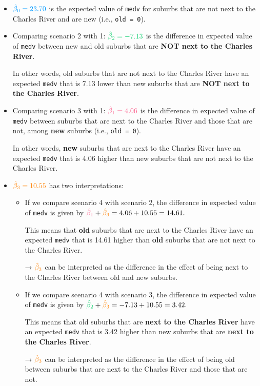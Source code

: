 \documentclass[
  12pt,
  letterpaper,
]{scrbook}
\theoremstyle{plain}
\theoremstyle{definition}
\theoremstyle{remark}
\begin{document}
\begin{itemize}
\item
  \(\color[HTML]{0099FF}{\hat{\beta}_0} = 23.70\) is the expected value
  of \texttt{medv} for suburbs that are not next to the Charles River
  and are new (i.e., \texttt{old\ =\ 0}).
\item
  Comparing scenario 2 with 1:
  \(\color[HTML]{00CC66}{\hat{\beta}_2} = -7.13\) is the difference in
  expected value of \texttt{medv} between new and old suburbs that are
  \textbf{NOT next to the Charles River}.

  In other words, old suburbs that are not next to the Charles River
  have an expected \texttt{medv} that is 7.13 lower than new suburbs
  that are \textbf{NOT next to the Charles River}.
\item
  Comparing scenario 3 with 1:
  \(\color[HTML]{fb5b89}{\hat{\beta}_1} = 4.06\) is the difference in
  expected value of \texttt{medv} between suburbs that are next to the
  Charles River and those that are not, among \textbf{new} suburbs
  (i.e., \texttt{old\ =\ 0}).

  In other words, \textbf{new} suburbs that are next to the Charles
  River have an expected \texttt{medv} that is 4.06 higher than new
  suburbs that are not next to the Charles River.
\item
  \(\color{orange}{\hat{\beta}_3} = 10.55\) has two interpretations:

  \begin{itemize}
  \item
    If we compare scenario 4 with scenario 2, the difference in expected
    value of \texttt{medv} is given by
    \({\color[HTML]{fb5b89}\hat{\beta}_1} + {\color{orange}\hat{\beta}_3} = 4.06 + 10.55 = 14.61.\)

    This means that \textbf{old} suburbs that are next to the Charles
    River have an expected \texttt{medv} that is 14.61 higher than
    \textbf{old} suburbs that are not next to the Charles River.

    → \(\color{orange}{\hat{\beta}_3}\) can be interpreted as the
    difference in the effect of being next to the Charles River between
    old and new suburbs.
  \item
    If we compare scenario 4 with scenario 3, the difference in expected
    value of \texttt{medv} is given by
    \({\color[HTML]{00CC66}\hat{\beta}_2} + {\color{orange}\hat{\beta}_3} = -7.13 + 10.55 = 3.42.\)

    This means that old suburbs that are \textbf{next to the Charles
    River} have an expected \texttt{medv} that is 3.42 higher than new
    suburbs that are \textbf{next to the Charles River}.

    → \(\color{orange}{\hat{\beta}_3}\) can be interpreted as the
    difference in the effect of being old between suburbs that are next
    to the Charles River and those that are not.
  \end{itemize}
\end{itemize}
\end{document}
